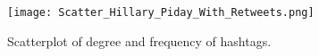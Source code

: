 \documentclass[journal, a4paper, 12pt]{article}
\begin{document}





        \begin{figure}[!hbt]
            \begin{center}
            \texttt{[image: Scatter\_Hillary\_Piday\_With\_Retweets.png]}
            \caption{Scatterplot of degree and frequency of hashtags.}
            \label{fig:scatter_hillary_piday_with_retweets}
            \end{center}
      \end{figure}
    
\end{document}
